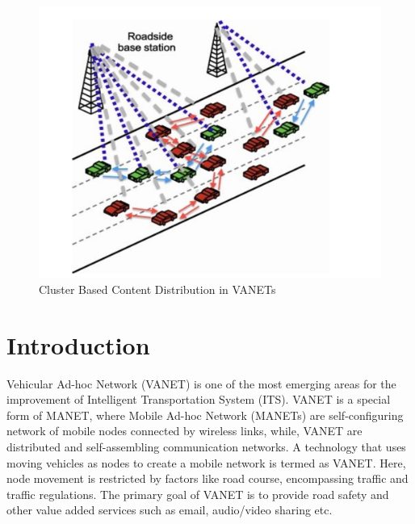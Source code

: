 \documentclass{acm_proc_article-sp}
\begin{document}
\begin{abstract}
\end{abstract}


\begin{figure}
\centering
\includegraphics[scale=.33]{working.png} \caption{Cluster Based Content Distribution in VANETs}
\label{working}
\end{figure}

\section{Introduction}
\vspace{1 mm}

Vehicular Ad-hoc Network (VANET) is one of the most emerging areas for the improvement of Intelligent Transportation System (ITS). VANET is a special form of MANET, where Mobile Ad-hoc Network (MANETs) are self-configuring network of mobile nodes connected by wireless links, while, VANET are distributed and self-assembling communication networks. A technology that uses moving vehicles as nodes to create a mobile network is termed as VANET. Here, node movement is restricted by factors like road course, encompassing traffic and traffic regulations. The
primary goal of VANET is to provide road safety and other value added services such as email, audio/video sharing etc.
\end{document}
